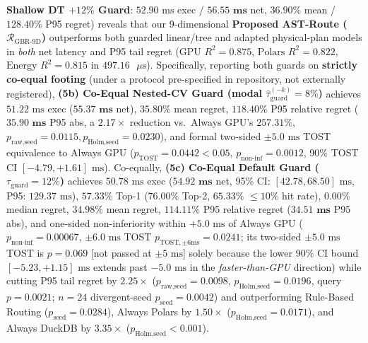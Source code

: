 \documentclass[10pt,a4paper]{article}
\begin{document}
\begin{enumerate}[leftmargin=1.5em,itemsep=0.8pt]
\textbf{Shallow DT $+12\%$ Guard}: $52.90\text{ ms}$ exec / $\mathbf{56.55\text{ ms}}$ net, $36.90\%$ mean / $128.40\%$ P95 regret) reveals that our 9-dimensional \textbf{Proposed AST-Route ($\mathcal{R}_{\text{GBR-9D}}$)} outperforms both guarded linear/tree and adapted physical-plan models in \emph{both} net latency and P95 tail regret ($\text{GPU } R^2 = \mathbf{0.875}$, $\text{Polars } R^2 = \mathbf{0.822}$, $\text{Energy } R^2 = \mathbf{0.815}$ in $497.16\text{ }\mu\text{s}$). Specifically, reporting both guards on \textbf{strictly co-equal footing} (under a protocol pre-specified in repository, not externally registered), \textbf{(5b) Co-Equal Nested-CV Guard (modal $\hat{\tau}_{\text{guard}}^{(-k)}=8\%$)} achieves $51.22\text{ ms}$ exec ($\mathbf{55.37\text{ ms}}$ net), $35.80\%$ mean regret, $\mathbf{118.40\%}$ P95 relative regret ($\mathbf{35.90\text{ ms}}$ P95 abs, a $\mathbf{2.17\times}$ reduction vs.\ Always GPU's $257.31\%$, $p_{\text{raw,seed}}=\mathbf{0.0115}, p_{\text{Holm,seed}}=\mathbf{0.0230}$), and formal two-sided $\pm 5.0\text{ ms}$ TOST equivalence to Always GPU ($p_{\text{TOST}}=\mathbf{0.0442} < 0.05$, $p_{\text{non-inf}}=0.0012$, 90\% TOST CI $[-4.79, +1.61]\text{ ms}$). Co-equally, \textbf{(5c) Co-Equal Default Guard ($\tau_{\text{guard}}=12\%$)} achieves $50.78\text{ ms}$ exec ($\mathbf{54.92\text{ ms}}$ net, 95\% CI: $[42.78, 68.50]\text{ ms}$, P95: $129.37\text{ ms}$), $\mathbf{57.33\%}$ Top-1 ($\mathbf{76.00\%}$ Top-2, $\mathbf{65.33\%}$ $\le 10\%$ hit rate), $\mathbf{0.00\%}$ median regret, $\mathbf{34.98\%}$ mean regret, $\mathbf{114.11\%}$ P95 relative regret ($\mathbf{34.51\text{ ms}}$ P95 abs), and one-sided non-inferiority within $+5.0\text{ ms}$ of Always GPU ($p_{\text{non-inf}}=\mathbf{0.00067}$, $\pm 6.0\text{ ms}$ TOST $p_{\text{TOST},\pm 6\text{ms}}=0.0241$; its two-sided $\pm 5.0\text{ ms}$ TOST is $p=0.069$ [not passed at $\pm 5\text{ ms}$] solely because the lower 90\% CI bound $[-5.23, +1.15]\text{ ms}$ extends past $-5.0\text{ ms}$ in the \emph{faster-than-GPU} direction) while cutting P95 tail regret by $\mathbf{2.25\times}$ ($p_{\text{raw,seed}}=\mathbf{0.0098}$, $p_{\text{Holm,seed}}=\mathbf{0.0196}$, query $p=\mathbf{0.0021}$; $n=24$ divergent-seed $p_{\text{seed}}=\mathbf{0.0042}$) and outperforming Rule-Based Routing ($p_{\text{seed}}=0.0284$), Always Polars by $\mathbf{1.50\times}$ ($p_{\text{Holm,seed}}=0.0171$), and Always DuckDB by $\mathbf{3.35\times}$ ($p_{\text{Holm,seed}} < 0.001$).

\end{enumerate}
\end{document}

